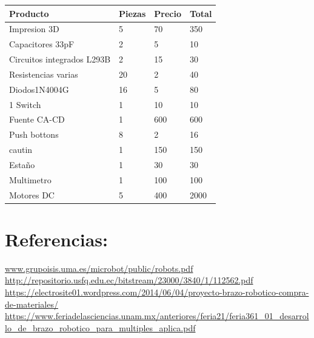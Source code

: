 \documentclass[14pt,a4paper]{article}
\begin{document}
\begin{tabular}{|l|l|l|l|}
\hline
	Producto & Piezas & Precio & Total\\
\hline
	Impresion 3D & 5 & 70 & 350\\

\hline
	Capacitores 33pF & 2 & 5 & 10\\
\hline
	 Circuitos integrados L293B & 2 & 15 & 30\\
\hline
	Resistencias varias & 20 & 2 & 40\\
\hline
	Diodos1N4004G & 16 & 5 & 80\\
\hline
	1 Switch & 1 & 10 & 10\\

\hline
	Fuente CA-CD & 1 & 600 & 600\\
\hline
	Push bottons & 8 & 2 & 16\\
\hline
cautin & 1 & 150 & 150\\
\hline
	Estaño & 1 & 30 & 30\\
\hline
	Multimetro & 1 & 100 & 100\\
\hline
Motores DC & 5 & 400 & 2000\\
\hline
\end{tabular}

\section{Referencias:}
\url{www.grupoisis.uma.es/microbot/public/robots.pdf}\\

\url{http://repositorio.usfq.edu.ec/bitstream/23000/3840/1/112562.pdf}\\

\url{https://electrosite01.wordpress.com/2014/06/04/proyecto-brazo-robotico-compra-de-materiales/}\\

\url{https://www.feriadelasciencias.unam.mx/anteriores/feria21/feria361_01_desarrollo_de_brazo_robotico_para_multiples_aplica.pdf}
\end{document}
